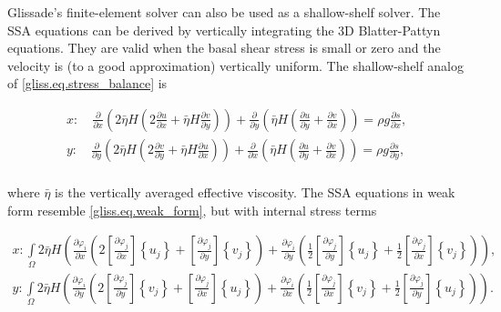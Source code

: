 {Glissade's finite-element solver can also be used as a shallow-shelf solver.  The SSA equations 
can be derived by vertically integrating the 3D Blatter-Pattyn equations.
They are valid when the basal shear stress is small or zero and the velocity is 
(to a good approximation) vertically uniform.  The shallow-shelf analog of \eqref{gliss.eq.stress_balance} is

\begin{equation}
  \label{gliss.eq.stress_balance_ssa}
  \begin{split}
    x: \quad \frac{\partial }{\partial x}\left( 2 \bar{\eta} H \left(2\frac{\partial u}{\partial x} +  \bar{\eta} H \frac{\partial v}{\partial y} \right) \right) 
    + \frac{\partial }{\partial y}\left( \bar{\eta} H \left( \frac{\partial u}{\partial y} + \frac{\partial v}{\partial x} \right) \right) 
    = \rho g\frac{\partial s}{\partial x}, \\
    y: \quad \frac{\partial }{\partial y}\left( 2 \bar{\eta} H \left( 2\frac{\partial v}{\partial y} + \bar{\eta} H \frac{\partial u}{\partial x} \right) \right) 
    + \frac{\partial }{\partial x}\left( \bar{\eta} H \left( \frac{\partial u}{\partial y} + \frac{\partial v}{\partial x} \right) \right) 
    = \rho g\frac{\partial s}{\partial y},  \\
  \end{split}
\end{equation}

\noindent
where $\bar{\eta}$ is the vertically averaged effective viscosity.
The SSA equations in weak form resemble \eqref{gliss.eq.weak_form},
but with internal stress terms

\begin{equation}
  \label{gliss.eq.element_matrix_ssa}
  \begin{split}
    x: \int\limits_{\Omega }{2\bar{\eta} H \left( \frac{\partial {{\varphi }_{i}}}{\partial x}\left( 2\left[ \frac{\partial {{\varphi }_{j}}}{\partial x} \right]\left\{ {{u}_{j}} \right\} + \left[ \frac{\partial {{\varphi }_{j}}}{\partial y} \right]\left\{ {{v}_{j}} \right\} \right) +
      \frac{\partial {{\varphi }_{i}}}{\partial y}\left( \frac{1}{2}\left[ \frac{\partial {{\varphi }_{j}}}{\partial y} \right]\left\{ {{u}_{j}} \right\}+\frac{1}{2}\left[ \frac{\partial {{\varphi }_{j}}}{\partial x} \right]\left\{ {{v}_{j}} \right\} \right) \right)},  \\
    y: \int\limits_{\Omega }{2\bar{\eta} H \left( \frac{\partial {{\varphi }_{i}}}{\partial y}\left( 2\left[ \frac{\partial {{\varphi }_{j}}}{\partial y} \right]\left\{ {{v}_{j}} \right\} + \left[ \frac{\partial {{\varphi }_{j}}}{\partial x} \right]\left\{ {{u}_{j}} \right\} \right) + 
      \frac{\partial {{\varphi }_{i}}}{\partial x}\left( \frac{1}{2}\left[ \frac{\partial {{\varphi }_{j}}}{\partial x} \right]\left\{ {{v}_{j}} \right\}+\frac{1}{2}\left[ \frac{\partial {{\varphi }_{j}}}{\partial y} \right]\left\{ {{u}_{j}} \right\} \right) \right)}.  \\
  \end{split}
\end{equation}

}
